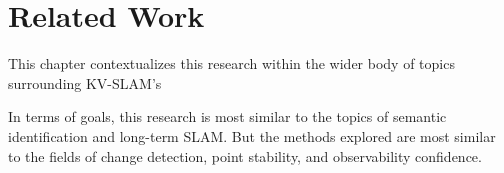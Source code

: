 \section{Related Work}
\label{sec:related_work}

This chapter contextualizes this research within the wider body of topics surrounding KV-SLAM's 

In terms of goals, this research is most similar to the topics of semantic identification and long-term SLAM. But the methods explored are most similar to the fields of change detection, point stability, and observability confidence.

% 